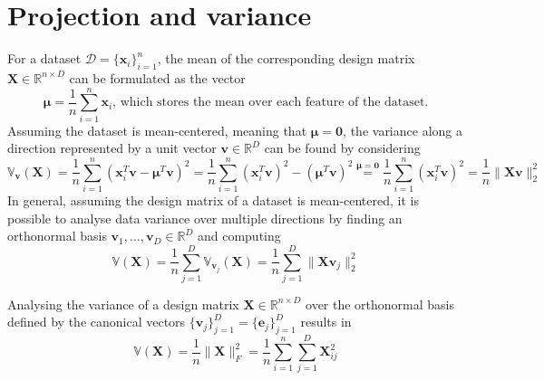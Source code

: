 \documentclass{report}
\begin{document}
\section{Projection and variance}
For a dataset $\displaystyle \mathcal{D} = \{\mathbf{x}_i\}_{i = 1}^n$, the mean of the corresponding design matrix $\displaystyle \mathbf{X} \in \mathbb{R}^{n \times D}$ can be formulated as the vector
\[\mathbf{\mu} = \frac{1}{n}\sum_{i = 1}^n \mathbf{x}_i \text{, which stores the mean over each feature of the dataset.}\]
Assuming the dataset is mean-centered, meaning that $\displaystyle \mathbf{\mu} = \mathbf{0}$, the variance along a direction represented by a unit vector $\displaystyle \mathbf{v} \in \mathbb{R}^D$ can be found by considering
\[\mathbb{V}_{\mathbf{v}}(\mathbf{X}) = \frac{1}{n}\sum_{i = 1}^n (\mathbf{x}_i^T\mathbf{v} - \mathbf{\mu}^T\mathbf{v})^2 = \frac{1}{n}\sum_{i = 1}^n (\mathbf{x}_i^T\mathbf{v})^2 - (\mathbf{\mu}^T\mathbf{v})^2 \stackrel{\mathbf{\mu} = \mathbf{0}}{=} \frac{1}{n}\sum_{i = 1}^n (\mathbf{x}_i^T\mathbf{v})^2 = \frac{1}{n}\lVert \mathbf{Xv} \rVert_2^2\]
In general, assuming the design matrix of a dataset is mean-centered, it is possible to analyse data variance over multiple directions by finding an orthonormal basis $\displaystyle \mathbf{v}_1, \dots, \mathbf{v}_D \in \mathbb{R}^D$ and computing
\[\mathbb{V}(\mathbf{X}) = \frac{1}{n}\sum_{j = 1}^D \mathbb{V}_{\mathbf{v}_j}(\mathbf{X}) = \frac{1}{n}\sum_{j = 1}^D \lVert \mathbf{Xv}_j \rVert_2^2\]
\begin{examplebox}
    Analysing the variance of a design matrix $\displaystyle \mathbf{X} \in \mathbb{R}^{n \times D}$ over the orthonormal basis defined by the canonical vectors $\displaystyle \{\mathbf{v}_j\}_{j = 1}^D = \{\mathbf{e}_j\}_{j = 1}^D$ results in
    \[\mathbb{V}(\mathbf{X}) = \frac{1}{n}\lVert \mathbf{X} \rVert_F^2 = \frac{1}{n}\sum_{i = 1}^n\sum_{j = 1}^D \mathbf{X}_{ij}^2\]
\end{examplebox}
\end{document}
